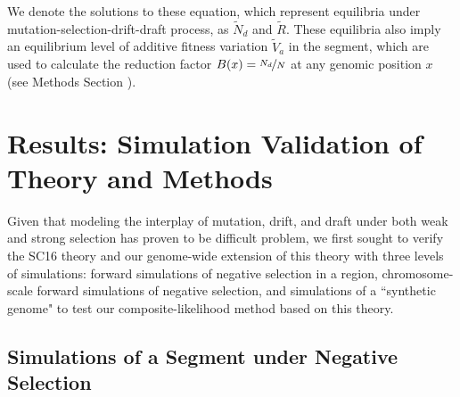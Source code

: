 \documentclass[11pt]{article}
\begin{document}
We denote the solutions to these equation, which represent equilibria under
mutation-selection-drift-draft process, as $\widetilde{N}_d$ and
$\widetilde{R}$. These equilibria also imply an equilibrium level of additive
fitness variation $\widetilde{V}_a$ in the segment, which are used to calculate
the reduction factor $B(x) = \nicefrac{N_d}{N}$ at any genomic position $x$
(see Methods Section ).

\section*{Results: Simulation Validation of Theory and Methods}

Given that modeling the interplay of mutation, drift, and draft under both weak
and strong selection has proven to be difficult problem, we first sought to
verify the SC16 theory and our genome-wide extension of this theory with three
levels of simulations: forward simulations of negative selection in a region,
chromosome-scale forward simulations of negative selection, and simulations of
a ``synthetic genome" to test our composite-likelihood method based on this
theory.

\subsection*{Simulations of a Segment under Negative Selection}
\label{sec:segment-sims}
\end{document}
